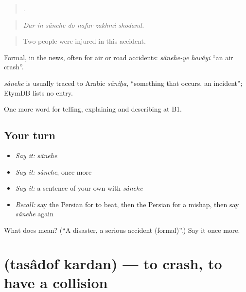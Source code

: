 \begin{quote}
      .
\end{quote}

\begin{quote}
\emph{Dar in sânehe do nafar zakhmi shodand.}
\end{quote}

\begin{quote}
Two people were injured in this accident.
\end{quote}

Formal, in the news, often for air or road accidents: \emph{sânehe-ye havâyi} \textquotedblleft{}an air crash\textquotedblright{}.

\begin{cousinweb}
\emph{sânehe} is usually traced to Arabic \emph{sāniḥa}, \textquotedblleft{}something that occurs, an incident\textquotedblright{}; EtymDB lists no entry.
\end{cousinweb}

\begin{grammarlens}[title={What you've built}]
One more word for telling, explaining and describing at B1.
\end{grammarlens}

\subsection*{Your turn}
\begin{itemize}
\raggedright
  \item \emph{Say it:} \emph{sânehe}
  \item \emph{Say it:} \emph{sânehe}, once more
  \item \emph{Say it:} a sentence of your own with \emph{sânehe}
  \item \emph{Recall:} say the Persian for to beat, then the Persian for a mishap, then say \emph{sânehe} again
\end{itemize}

\begin{tcolorbox}[breakable,colback=teal!4,colframe=teal!35!black,title={Before you move on}]
What does  mean? (\textquotedblleft{}A disaster, a serious accident (formal)\textquotedblright{}.) Say it once more.
\end{tcolorbox}
\section[\texorpdfstring{\fa{تصادف} \fa{کردن} (tasâdof kardan)}{تصادف کردن (tasâdof kardan)}]{  (tasâdof kardan) — to crash, to have a collision}

